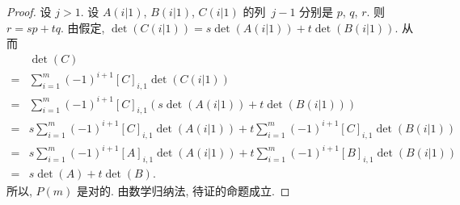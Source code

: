 \documentclass[../libro.tex]{subfiles}
\begin{document}
\begin{proof}
    设 \(j > 1\).
    设 \(A(i|1)\), \(B(i|1)\), \(C(i|1)\)
    的列~\(j-1\) 分别是 \(p\), \(q\), \(r\).
    则 \(r = sp + tq\).
    由假定,
    \(\det {(C(i|1))} = s\det {(A(i|1))} + t\det {(B(i|1))}\).
    从而
    \begin{align*}
        & \det {(C)}
        \\
        = {} &
        \sum_{i = 1}^{m}
        {(-1)^{i+1} [C]_{i,1} \det {(C(i|1))}}
        \\
        = {} &
        \sum_{i = 1}^{m}
        {(-1)^{i+1} [C]_{i,1}
        (s\det {(A(i|1))} + t\det {(B(i|1))})}
        \\
        = {} &
        s \sum_{i = 1}^{m}
        {(-1)^{i+1} [C]_{i,1} \det {(A(i|1))}}
        +
        t \sum_{i = 1}^{m}
        {(-1)^{i+1} [C]_{i,1} \det {(B(i|1))}}
        \\
        = {} &
        s \sum_{i = 1}^{m}
        {(-1)^{i+1} [A]_{i,1} \det {(A(i|1))}}
        +
        t \sum_{i = 1}^{m}
        {(-1)^{i+1} [B]_{i,1} \det {(B(i|1))}}
        \\
        = {} &
        s \det {(A)} + t \det {(B)}.
    \end{align*}
    所以, \(P(m)\) 是对的.
    由数学归纳法, 待证的命题成立.
\end{proof}
\end{document}
